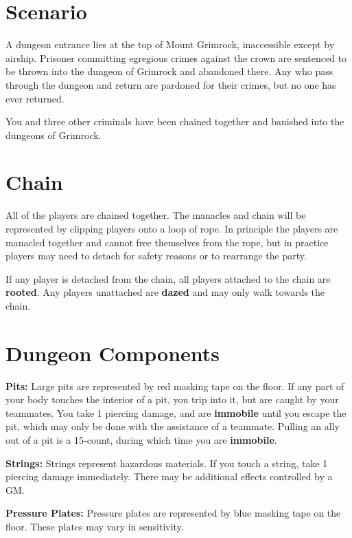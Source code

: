 \documentclass[green]{grimrock}
\begin{document}
\name{\gRules{}}

\section{Scenario}

A dungeon entrance lies at the top of Mount Grimrock, inaccessible except by airship.  Prisoner committing egregious crimes against the crown are sentenced to be thrown into the dungeon of Grimrock and abandoned there.  Any who pass through the dungeon and return are pardoned for their crimes, but no one has ever returned.

You and three other criminals have been chained together and banished into the dungeons of Grimrock.


\section{Chain}

All of the players are chained together. The manacles and chain will be represented by clipping players onto a loop of rope.  In principle the players are manacled together and cannot free themselves from the rope, but in practice players may need to detach for safety reasons or to rearrange the party.

If any player is detached from the chain, all players attached to the chain are {\bf rooted}.  Any players unattached are {\bf dazed} and may only walk towards the chain.

\section{Dungeon Components}

{\bf Pits:}  Large pits are represented by red masking tape on the floor.  If any part of your body touches the interior of a pit, you trip into it, but are caught by your teammates.  You take 1 piercing damage, and are {\bf immobile} until you escape the pit, which may only be done with the assistance of a teammate.  Pulling an ally out of a pit is a 15-count, during which time you are {\bf immobile}.

{\bf Strings:} Strings represent hazardous materials.  If you touch a string, take 1 piercing damage immediately.  There may be additional effects controlled by a GM.

{\bf Pressure Plates:} Pressure plates are represented by blue masking tape on the floor.  These plates may vary in sensitivity.
\end{document}

